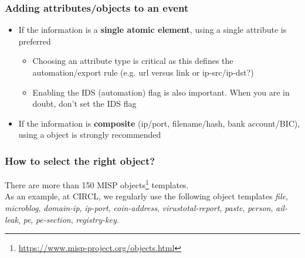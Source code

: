 \begin{frame}
\frametitle{Adding attributes/objects to an event}
\begin{itemize}
        \item If the information is a {\bf single atomic element}, using a single attribute is preferred
                \begin{itemize}
                        \item Choosing an attribute type is critical as this defines the automation/export rule (e.g. url versus link or ip-src/ip-dst?)
                        \item Enabling the IDS (automation) flag is also important. When you are in doubt, don't set the IDS flag
                \end{itemize}
        \item If the information is {\bf composite} (ip/port, filename/hash, bank account/BIC), using a object is strongly recommended
\end{itemize}
\end{frame}

\begin{frame}
       \frametitle{How to select the right object?}

        There are more than 150 MISP objects\footnote{\url{https://www.misp-project.org/objects.html}} templates.\\
      As an example, at CIRCL, we regularly use the following object templates {\it file}, {\it microblog}, {\it domain-ip}, {\it ip-port}, {\it coin-address}, {\it virustotal-report}, {\it paste}, {\it person}, {\it ail-leak}, {\it pe}, {\it pe-section}, {\it registry-key}.\\
\end{frame}

